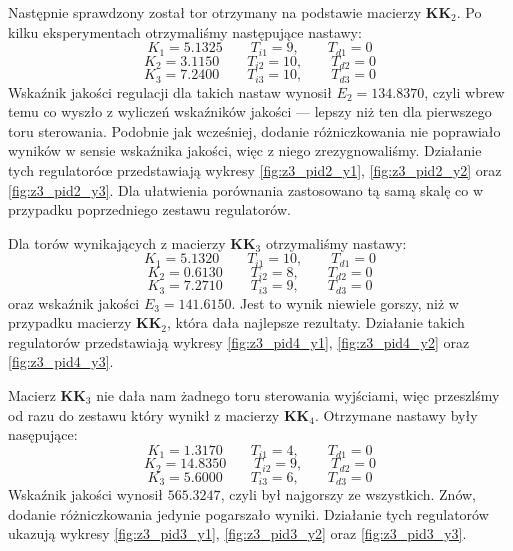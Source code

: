 Następnie sprawdzony został tor otrzymany na podstawie macierzy $\bm{KK}_2$.
Po kilku eksperymentach otrzymaliśmy następujące nastawy:
\begin{equation}
  K_1 = \num{5.1325} \qquad T_{i1} = 9, \qquad T_{d1} = 0 \nonumber
\end{equation}
\begin{equation}
  K_2 = \num{3.1150} \qquad T_{i2} = 10, \qquad T_{d2} = 0
\end{equation}
\begin{equation}
  K_3 = \num{7.2400} \qquad T_{i3} = 10, \qquad T_{d3} = 0 \nonumber
\end{equation}
Wskaźnik jakości regulacji dla takich nastaw wynosił $E_2 = \num{134.8370}$, czyli
wbrew temu co wyszło z wyliczeń wskaźników jakości --- lepszy niż ten dla pierwszego
toru sterowania. Podobnie jak wcześniej, dodanie różniczkowania nie poprawiało
wyników w sensie wskaźnika jakości, więc z niego zrezygnowaliśmy. Działanie
tych regulatoróœ przedstawiają wykresy \ref{fig:z3_pid2_y1},
\ref{fig:z3_pid2_y2} oraz \ref{fig:z3_pid2_y3}. Dla ułatwienia porównania zastosowano
tą samą skalę co w przypadku poprzedniego zestawu regulatorów.

Dla torów wynikających z macierzy $\bm{KK}_3$ otrzymaliśmy nastawy:
\begin{equation}
  K_1 = \num{5.1320} \qquad T_{i1} = 10, \qquad T_{d1} = 0 \nonumber
\end{equation}
\begin{equation}
  K_2 = \num{0.6130} \qquad T_{i2} = 8, \qquad T_{d2} = 0
\end{equation}
\begin{equation}
  K_3 = \num{7.2710} \qquad T_{i3} = 9, \qquad T_{d3} = 0 \nonumber
\end{equation}
oraz wskaźnik jakości $E_3 = \num{141.6150}$. Jest to wynik niewiele gorszy, niż
w przypadku macierzy $\bm{KK}_2$, która dała najlepsze rezultaty.
Działanie takich regulatorów przedstawiają wykresy \ref{fig:z3_pid4_y1},
\ref{fig:z3_pid4_y2} oraz \ref{fig:z3_pid4_y3}.

Macierz $\bm{KK}_3$ nie dała nam żadnego toru sterowania wyjściami, więc przeszlśmy
od razu do zestawu który wynikł z macierzy $\bm{KK}_4$. Otrzymane nastawy
były nasępujące:
\begin{equation}
  K_1 = \num{1.3170} \qquad T_{i1} = 4, \qquad T_{d1} = 0 \nonumber
\end{equation}
\begin{equation}
  K_2 = \num{14.8350} \qquad T_{i2} = 9, \qquad T_{d2} = 0
\end{equation}
\begin{equation}
  K_3 = \num{5.6000} \qquad T_{i3} = 6, \qquad T_{d3} = 0 \nonumber
\end{equation}
Wskaźnik jakości wynosił $\num{565.3247}$, czyli był najgorszy ze wszystkich.
Znów, dodanie różniczkowania jedynie pogarszało wyniki. Działanie tych
regulatorów ukazują wykresy \ref{fig:z3_pid3_y1},
\ref{fig:z3_pid3_y2} oraz \ref{fig:z3_pid3_y3}.


